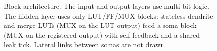 \begin{figure}[!htbp]
{}
\caption{Block architecture. The input and output layers use multi-bit logic. The hidden layer uses only LUT/FF/MUX blocks: stateless dendrite and merge LUTs (MUX on the LUT output) feed a soma block (MUX on the registered output) with self-feedback and a shared leak tick. Lateral links between somas are not drawn.}
\label{fig:architecture}
\end{figure}

